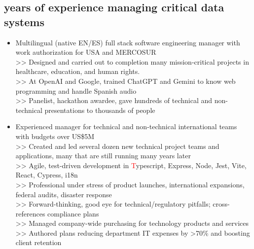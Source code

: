 \subsection{\number\numexpr{}\relax\space years of experience managing critical data systems}
\vspace{\topsep}
    \begin{itemize}
        \item Multilingual (native EN/ES) full stack software engineering manager with work authorization for USA and MERCOSUR
        \\ >> Designed and carried out to completion many mission-critical projects in healthcare, education, and human rights.
        \\ >> At OpenAI and Google, trained ChatGPT and Gemini to know web programming and handle Spanish audio
        \\ >> Panelist, hackathon awardee, gave hundreds of technical and non-technical presentations to thousands of people
        
        \item Experienced manager for technical and non-technical international teams with budgets over US\$5M
        \\ >> Created and led several dozen new technical project teams and applications, many that are still running many years later
        \\ >> Agile, test-driven development in {\textcolor{red}Typescript, Express, Node, Jest, Vite, React, Cypress, i18n}
        \\ >> Professional under stress of product launches, international expansions, federal audits, disaster response
        \\ >> Forward-thinking, good eye for technical/regulatory pitfalls; cross-references compliance plans
        \\ >> Managed company-wide purchasing for technology products and services
        \\ >> Authored plans reducing department IT expenses by >70\% and boosting client retention


\end{itemize}
